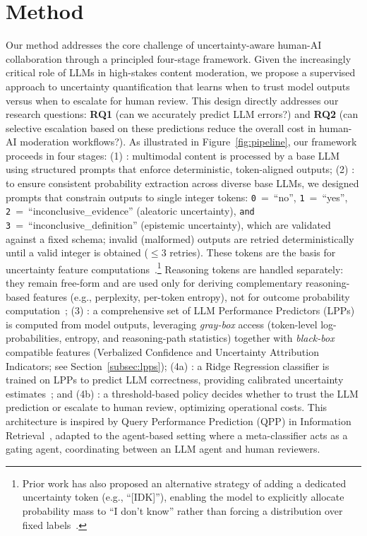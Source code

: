 \section{Method}
\label{sec:methods}
Our method addresses the core challenge of uncertainty-aware human-AI collaboration through a principled four-stage framework. Given the increasingly critical role of LLMs in high-stakes content moderation, we propose a supervised approach to uncertainty quantification that learns when to trust model outputs versus when to escalate for human review. This design directly addresses our research questions: \textbf{RQ1} (can we accurately predict LLM errors?) and \textbf{RQ2} (can selective escalation based on these predictions reduce the overall cost in human-AI moderation workflows?).
As illustrated in Figure~\ref{fig:pipeline}, our framework proceeds in four stages:
(1) : multimodal content is processed by a base LLM using structured prompts that enforce deterministic, token-aligned outputs; (2) : to ensure consistent probability extraction across diverse base LLMs, we designed prompts that constrain outputs to single integer tokens: \texttt{0}~=~``no'', \texttt{1}~=~``yes'', \texttt{2}~=~``inconclusive\_evidence'' (aleatoric uncertainty), \texttt{and 3}~=~``inconclusive\_definition'' (epistemic uncertainty), which are validated against a fixed schema; invalid (malformed) outputs are retried deterministically until a valid integer is obtained ($\leq 3$ retries). These tokens are the basis for uncertainty feature computations~\cite{kapoor2024large,farr-etal-2025-red,gupta2024language,orgad2025llmsknowshowintrinsic}.\footnote{Prior work has also proposed an alternative strategy of adding a dedicated uncertainty token (e.g., ``[IDK]''), enabling the model to explicitly allocate probability mass to ``I don’t know'' rather than forcing a distribution over fixed labels~\cite{cohen2024i}.} Reasoning tokens are handled separately: they remain free-form and are used only for deriving complementary reasoning-based features (e.g., perplexity, per-token entropy), not for outcome probability computation~\cite{guerreiro-etal-2023-looking,efficient-and-effective}; (3) : a comprehensive set of LLM Performance Predictors (LPPs) is computed from model outputs, leveraging {\em gray-box} access (token-level log-probabilities, entropy, and reasoning-path statistics) together with {\em black-box} compatible features (Verbalized Confidence and Uncertainty Attribution Indicators; see Section~\ref{subsec:lpps}); (4a) : a Ridge Regression classifier is trained on LPPs to predict LLM correctness, providing calibrated uncertainty estimates~\cite{arthur+al:00}; and (4b) : a threshold-based policy decides whether to trust the LLM prediction or escalate to human review, optimizing operational costs.
This architecture is inspired by Query Performance Prediction (QPP) in Information Retrieval~\cite{carmel+Elad:10}, adapted to the agent-based setting where a meta-classifier acts as a gating agent, coordinating between an LLM agent and human reviewers.

